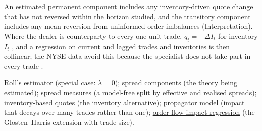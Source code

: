 \begin{qfresult}
 An estimated permanent component includes any inventory-driven quote change that has not reversed within the horizon studied, and the transitory component includes any mean reversion from uninformed order imbalances (Interpretation). Where the dealer is counterparty to every one-unit trade, $q_t=-\Delta I_t$ for inventory $I_t$ \citep[sec.~11.3.2, p.~112]{s6-hasbrouck}, and a regression on current and lagged trades and inventories is then collinear; the NYSE data avoid this because the specialist does not take part in every trade \citep[sec.~11.4, p.~115]{s6-hasbrouck}.

 \hyperref[res:roll-spread-estimator]{Roll's estimator} (special case: $\lambda=0$); \hyperref[res:adverse-selection-spread-component]{spread components} (the theory being estimated); \hyperref[def:spread-measures]{spread measures} (a model-free split by effective and realised spreads); \hyperref[mod:inventory-based-quotes]{inventory-based quotes} (the inventory alternative); \hyperref[mod:propagator]{propagator model} (impact that decays over many trades rather than one); \hyperref[meth:order-flow-impact-regression]{order-flow impact regression} (the Glosten--Harris extension with trade size).

\end{qfresult}

